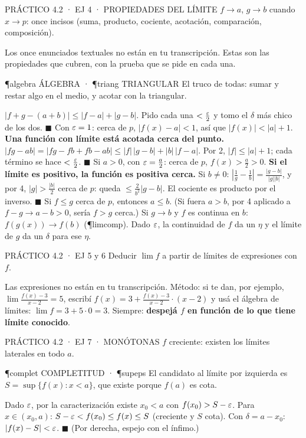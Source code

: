 \begin{enunciado}{PRÁCTICO 4.2 · EJ 4 · PROPIEDADES DEL LÍMITE}
$f\to a$, $g\to b$ cuando $x\to p$: once incisos (suma, producto, cociente, acotación, comparación, composición).
\end{enunciado}
\begin{falta}
Los once enunciados textuales no están en tu transcripción. Estas son las propiedades que cubren, con la prueba que se pide en cada una.
\end{falta}
\begin{uso}{\P{algebra} ÁLGEBRA · \P{triang} TRIANGULAR}
El truco de todas: sumar y restar algo en el medio, y acotar con la triangular.
\end{uso}
$|f+g-(a+b)|\le|f-a|+|g-b|$. Pido cada una $<\frac{\varepsilon}2$ y tomo el $\delta$ más chico de los dos. $\blacksquare$
Con $\varepsilon=1$: cerca de $p$, $|f(x)-a|<1$, así que $|f(x)|<|a|+1$. \textbf{Una función con límite está acotada cerca del punto.}
$|fg-ab|=|fg-fb+fb-ab|\le|f|\,|g-b|+|b|\,|f-a|$. Por 2, $|f|\le|a|+1$; cada término se hace $<\frac{\varepsilon}2$. $\blacksquare$
Si $a>0$, con $\varepsilon=\frac a2$: cerca de $p$, $f(x)>\frac a2>0$. \textbf{Si el límite es positivo, la función es positiva cerca.}
Si $b\neq0$: $\left|\frac1g-\frac1b\right|=\frac{|g-b|}{|g||b|}$, y por 4, $|g|>\frac{|b|}2$ cerca de $p$: queda $\le\frac2{b^2}|g-b|$. El cociente es producto por el inverso. $\blacksquare$
Si $f\le g$ cerca de $p$, entonces $a\le b$. (Si fuera $a>b$, por 4 aplicado a $f-g\to a-b>0$, sería $f>g$ cerca.)
Si $g\to b$ y $f$ es continua en $b$: $f(g(x))\to f(b)$ (\P{limcomp}). Dado $\varepsilon$, la continuidad de $f$ da un $\eta$ y el límite de $g$ da un $\delta$ para ese $\eta$.

\begin{enunciado}{PRÁCTICO 4.2 · EJ 5 y 6}
Deducir $\lim f$ a partir de límites de expresiones con $f$.
\end{enunciado}
\begin{falta}
Las expresiones no están en tu transcripción. Método: si te dan, por ejemplo, $\lim\frac{f(x)-3}{x-2}=5$, escribí $f(x)=3+\frac{f(x)-3}{x-2}\cdot(x-2)$ y usá el álgebra de límites: $\lim f=3+5\cdot0=3$. Siempre: \textbf{despejá $f$ en función de lo que tiene límite conocido}.
\end{falta}

\begin{enunciado}{PRÁCTICO 4.2 · EJ 7 · MONÓTONAS}
$f$ creciente: existen los límites laterales en todo $a$.
\end{enunciado}
\begin{uso}{\P{complet} COMPLETITUD · \P{supeps}}
El candidato al límite por izquierda es $S=\sup\{f(x):x<a\}$, que existe porque $f(a)$ es cota.
\end{uso}
Dado $\varepsilon$, por la caracterización existe $x_0<a$ con $f(x_0)>S-\varepsilon$. Para $x\in(x_0,a)$: $S-\varepsilon<f(x_0)\le f(x)\le S$ (creciente y $S$ cota). Con $\delta=a-x_0$: $|f(x)-S|<\varepsilon$. $\blacksquare$ (Por derecha, espejo con el ínfimo.)

